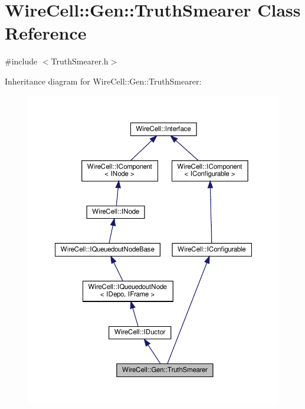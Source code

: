 \hypertarget{class_wire_cell_1_1_gen_1_1_truth_smearer}{}\section{Wire\+Cell\+:\+:Gen\+:\+:Truth\+Smearer Class Reference}
\label{class_wire_cell_1_1_gen_1_1_truth_smearer}


{\ttfamily \#include $<$Truth\+Smearer.\+h$>$}



Inheritance diagram for Wire\+Cell\+:\+:Gen\+:\+:Truth\+Smearer\+:
\nopagebreak
\begin{figure}[H]
\begin{center}
\leavevmode
\includegraphics[width=350pt]{class_wire_cell_1_1_gen_1_1_truth_smearer__inherit__graph}
\end{center}
\end{figure}


